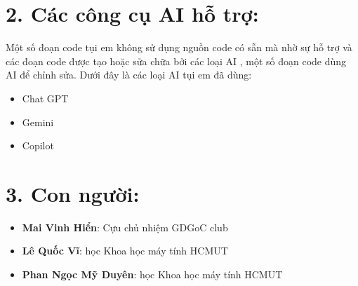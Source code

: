 \documentclass{article}
\begin{document}
\section{2. Các công cụ AI hỗ trợ:}
Một số đoạn code tụi em không sử dụng nguồn code có sẵn mà nhờ sự hỗ trợ và các đoạn code được tạo hoặc sửa chữa bởi các loại AI , một số đoạn code dùng AI để chỉnh sửa. Dưới đây là các loại AI tụi em đã dùng:
\begin{itemize}
    \item Chat GPT
    \item Gemini
    \item Copilot
\end{itemize}

\section{3. Con người: }
\begin{itemize}
    \item\textbf{Mai Vinh Hiển}: Cựu chủ nhiệm GDGoC club
    \item\textbf{Lê Quốc Vĩ}: học Khoa học máy tính HCMUT
    \item\textbf{Phan Ngọc Mỹ Duyên}: học Khoa học máy tính HCMUT
\end{itemize}
\end{document}
